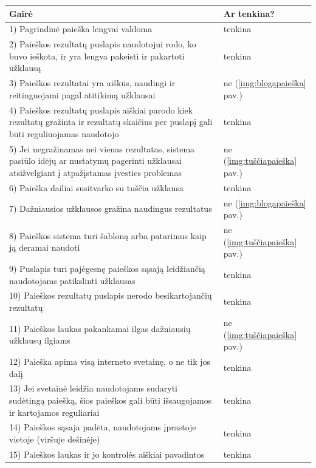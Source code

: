 \documentclass{VUMIFPSkursinis}
\begin{document}
\begin{center}
\label{PaieškosLentelėPrad}
\begin{tabular}{ |p{}|p{2cm}| } 
 \hline
	Gairė & Ar tenkina? \\ \hline
	1) Pagrindinė paieška lengvai valdoma & tenkina \\ \hline
	2) Paieškos rezultatų puslapis naudotojui rodo, ko buvo ieškota, ir yra lengva pakeisti ir pakartoti užklausą & tenkina \\ \hline
	3) Paieškos rezultatai yra aiškūs, naudingi ir reitinguojami pagal atitikimą užklausai & ne (\ref{img:blogapaieška} pav.) \\ \hline
	4) Paieškos rezultatų puslapis aiškiai parodo kiek rezultatų gražinta ir rezultatų skaičius per puslapį gali būti reguliuojamas naudotojo & tenkina \\ \hline
	5) Jei negražinamas nei vienas rezultatas, sistema pasiūlo idėjų ar nustatymų pagerinti užklausai atsižvelgiant į atpažįstamas įvesties problemas & ne (\ref{img:tuščiapaieška} pav.) \\ \hline
	6) Paieška dailiai susitvarko su tuščia užklausa & tenkina \\ \hline
	7) Dažniausios užklausos gražina naudingus rezultatus & ne (\ref{img:blogapaieška} pav.) \\ \hline
	8) Paieškos sistema turi šabloną arba patarimus kaip ją deramai naudoti & ne (\ref{img:tuščiapaieška} pav.) \\ \hline
	9) Puslapis turi pajėgesnę paieškos sąsają leidžiančią naudotojams patikslinti užklausas & tenkina \\ \hline
	10) Paieškos rezultatų puslapis nerodo besikartojančių rezultatų & tenkina \\ \hline
	11) Paieškos laukas pakankamai ilgas dažniausių užklausų ilgiams & ne (\ref{img:tuščiapaieška} pav.) \\ \hline
	12) Paieška apima visą interneto svetainę, o ne tik jos dalį & tenkina \\ \hline
	13) Jei svetainė leidžia naudotojams sudaryti sudėtingą paiešką, šios paieškos gali būti išsaugojamos ir kartojamos reguliariai & tenkina \\ \hline
	14) Paieškos sąsaja padėta, naudotojams įprastoje vietoje (viršuje dešinėje) & tenkina \\ \hline
	15) Paieškos laukas ir jo kontrolės aiškiai pavadintos & tenkina \\ \hline

\end{tabular}
\end{center}
\end{document}
